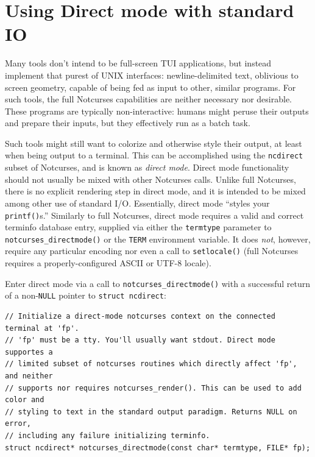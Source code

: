 \documentclass[letterpaper,10pt]{article}
\begin{document}
\section{Using Direct mode with standard I\/O}

Many tools don't intend to be full-screen TUI applications, but instead
implement that purest of UNIX interfaces: newline-delimited text, oblivious
to screen geometry, capable of being fed as input to other, similar programs.
For such tools, the full Notcurses capabilities are neither necessary nor
desirable. These programs are typically non-interactive: humans might peruse
their outputs and prepare their inputs, but they effectively run as a batch
task.

Such tools might still want to colorize and otherwise style their output, at
least when being output to a terminal. This can be accomplished using the
\texttt{ncdirect} subset of Notcurses, and is known as \textit{direct mode}. Direct
mode functionality should not usually be mixed with other Notcurses calls.
Unlike full Notcurses, there is no explicit rendering step in direct mode, and
it is intended to be mixed among other use of standard I/O. Essentially, direct
mode ``styles your \texttt{printf()}s.'' Similarly to full Notcurses, direct mode
requires a valid and correct terminfo database entry, supplied via either the
\texttt{termtype} parameter to \texttt{notcurses\_directmode()} or the \texttt{TERM} environment
variable. It does \textit{not}, however, require any particular encoding nor
even a call to \texttt{setlocale()} (full Notcurses requires a properly-configured
ASCII or UTF-8 locale).

Enter direct mode via a call to \texttt{notcurses\_directmode()} with a successful
return of a non-\texttt{NULL} pointer to \texttt{struct ncdirect}:

\begin{listing}[ht]
\begin{verbatim}
// Initialize a direct-mode notcurses context on the connected terminal at 'fp'.
// 'fp' must be a tty. You'll usually want stdout. Direct mode supportes a
// limited subset of notcurses routines which directly affect 'fp', and neither
// supports nor requires notcurses_render(). This can be used to add color and
// styling to text in the standard output paradigm. Returns NULL on error,
// including any failure initializing terminfo.
struct ncdirect* notcurses_directmode(const char* termtype, FILE* fp);
\end{verbatim}
\end{listing}
\end{document}
